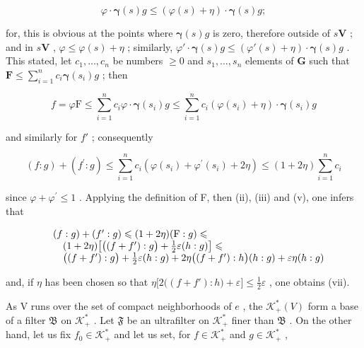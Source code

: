 \[
\varphi \cdot \boldsymbol {\gamma} (s) g \leqslant (\varphi (s) + \eta) \cdot \boldsymbol {\gamma} (s) g;
\]

for, this is obvious at the points where \(\pmb{\gamma}(s)g\) is zero, therefore outside of \(s\mathbf{V}\) ; and in \(s\mathbf{V}\) , \(\varphi \leqslant \varphi(s) + \eta\) ; similarly, \(\varphi' \cdot \pmb{\gamma}(s)g \leqslant (\varphi'(s) + \eta) \cdot \pmb{\gamma}(s)g\) . This stated, let \(c_1, \ldots, c_n\) be numbers \(\geqslant 0\) and \(s_1, \ldots, s_n\) elements of \(\mathbf{G}\) such that \(\mathbf{F} \leqslant \sum_{i=1}^{n} c_i \pmb{\gamma}(s_i)g\) ; then

\[
f = \varphi \mathrm{F} \leqslant \sum_ {i = 1} ^ {n} c _ {i} \varphi \cdot \boldsymbol {\gamma} (s _ {i}) g \leqslant \sum_ {i = 1} ^ {n} c _ {i} (\varphi (s _ {i}) + \eta) \cdot \boldsymbol {\gamma} (s _ {i}) g
\]

and similarly for \(f'\) ; consequently

\[
(f: g) + (f ^ {\prime}: g) \leqslant \sum_ {i = 1} ^ {n} c _ {i} (\varphi (s _ {i}) + \varphi^ {\prime} (s _ {i}) + 2 \eta) \leqslant (1 + 2 \eta) \sum_ {i = 1} ^ {n} c _ {i}
\]

since \(\varphi +\varphi^{\prime}\leqslant 1\) . Applying the definition of F, then (ii), (iii) and (v), one infers that

\[
\begin{array}{r l} & {(f: g) + (f ^ {\prime}: g) \leqslant (1 + 2 \eta) (\mathrm{F}: g) \leqslant} \\ & {\quad (1 + 2 \eta) \big [ \big ((f + f ^ {\prime}): g \big) + \frac {1}{2} \varepsilon (h: g) \big ] \leqslant} \\ & {\quad \big ((f + f ^ {\prime}): g \big) + \frac {1}{2} \varepsilon (h: g) + 2 \eta \big ((f + f ^ {\prime}): h \big) (h: g) + \varepsilon \eta (h: g)} \end{array}
\]

and, if \(\eta\) has been chosen so that \(\eta\big[2\big((f + f'):h\big) + \varepsilon\big] \leqslant \frac{1}{2}\varepsilon\) , one obtains (vii).

As V runs over the set of compact neighborhoods of \(e\) , the \(\mathcal{K}_{+}^{*}(V)\) form a base of a filter \(\mathfrak{B}\) on \(\mathcal{K}_{+}^{*}\) . Let \(\mathfrak{F}\) be an ultrafilter on \(\mathcal{K}_{+}^{*}\) finer than \(\mathfrak{B}\) . On the other hand, let us fix \(f_{0} \in \mathcal{K}_{+}^{*}\) and let us set, for \(f \in \mathcal{K}_{+}^{*}\) and \(g \in \mathcal{K}_{+}^{*}\) ,

